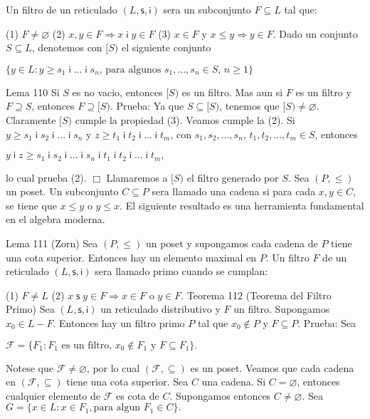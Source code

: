 Un filtro de un reticulado \((L,\mathsf{s},\mathsf{i})\) sera un subconjunto \(F\subseteq L\) tal que:

(1) \(F\neq \varnothing \)
(2) \(x,y\in F\Rightarrow x\;\mathsf{i\;}y\in F\)
(3) \(x\in F\) y \(x\leq y\Rightarrow y\in F\).
Dado un conjunto \(S\subseteq L\), denotemos con \([S)\) el siguiente conjunto

\(\displaystyle \{y\in L:y\geq s_{1}\;\mathsf{i\;}...\;\mathsf{i\;}s_{n}\text{, para algunos }s_{1},...,s_{n}\in S\text{, }n\geq 1\} \)

Lema 110 Si \(S\) es no vacio, entonces \([S)\) es un filtro. Mas aun si \(F\) es un filtro y \(F\supseteq S\), entonces \(F\supseteq \lbrack S)\).
Prueba: Ya que \(S\subseteq \lbrack S)\), tenemos que \([S)\neq \varnothing \). Claramente \([S)\) cumple la propiedad (3). Veamos cumple la (2). Si \(y\geq s_{1}\; \mathsf{i\;}s_{2}\;\mathsf{i\;}...\;\mathsf{i\;}s_{n}\) y \(z\geq t_{1}\; \mathsf{i\;}t_{2}\;\mathsf{i\;}\)...\(\;\mathsf{i\;}t_{m}\), con \( s_{1},s_{2},...,s_{n}\), \(t_{1},t_{2},...,t_{m}\in S\), entonces

\(\displaystyle y\;\mathsf{i\;}z\geq s_{1}\;\mathsf{i\;}s_{2}\;\mathsf{i\;}...\;\mathsf{i\;} s_{n}\;\mathsf{i\;}t_{1}\;\mathsf{i\;}t_{2}\;\mathsf{i\;}...\;\mathsf{i\;} t_{m}, \)

lo cual prueba (2). \(\Box\)
Llamaremos a \([S)\) el filtro generado por \(S\). Sea \( (P,\leq )\) un poset. Un subconjunto \(C\subseteq P\) sera llamado una cadena si para cada \(x,y\in C\), se tiene que \(x\leq y\) o \(y\leq x\). El siguiente resultado es una herramienta fundamental en el algebra moderna.

Lema 111 (Zorn) Sea \((P,\leq )\) un poset y supongamos cada cadena de \(P\) tiene una cota superior. Entonces hay un elemento maximal en \(P\).
Un filtro \(F\) de un reticulado \((L,\mathsf{s},\mathsf{i})\) sera llamado primo cuando se cumplan:

(1) \(F\neq L\)
(2) \(x\;\mathsf{s\;}y\in F\Rightarrow x\in F\) o \(y\in F\).
Teorema 112 (Teorema del Filtro Primo) Sea \((L,\mathsf{s},\mathsf{i})\) un reticulado distributivo y \(F\) un filtro. Supongamos \(x_{0}\in L-F\). Entonces hay un filtro primo \(P\) tal que \(x_{0}\notin P\) y \(F\subseteq P\).
Prueba: Sea

\(\displaystyle \mathcal{F}=\{F_{1}:F_{1}\text{ es un filtro, }x_{0}\notin F_{1}\text{ y } F\subseteq F_{1}\}. \)

Notese que \(\mathcal{F}\neq \varnothing \), por lo cual \((\mathcal{F},\subseteq )\) es un poset. Veamos que cada cadena en \((\mathcal{F},\subseteq )\) tiene una cota superior. Sea \(C\) una cadena. Si \(C=\varnothing \), entonces cualquier elemento de \(\mathcal{F}\) es cota de \(C\). Supongamos entonces \(C\neq \varnothing \). Sea
\(\displaystyle G=\{x\in L:x\in F_{1},\text{para algun }F_{1}\in C\}. \)

